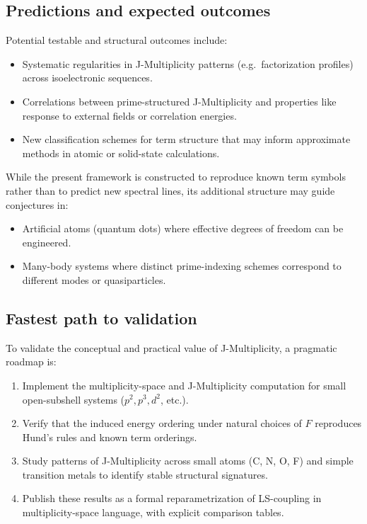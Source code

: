 \documentclass[11pt]{article}
\begin{document}
\subsection{Predictions and expected outcomes}

Potential testable and structural outcomes include:
\begin{itemize}
  \item Systematic regularities in J-Multiplicity patterns (e.g.\ factorization profiles) across isoelectronic sequences.
  \item Correlations between prime-structured J-Multiplicity and properties like response to external fields or correlation energies.
  \item New classification schemes for term structure that may inform approximate methods in atomic or solid-state calculations.
\end{itemize}

While the present framework is constructed to reproduce known term symbols rather than to predict new spectral lines, its additional structure may guide conjectures in:
\begin{itemize}
  \item Artificial atoms (quantum dots) where effective degrees of freedom can be engineered.
  \item Many-body systems where distinct prime-indexing schemes correspond to different modes or quasiparticles.
\end{itemize}

\subsection{Fastest path to validation}

To validate the conceptual and practical value of J-Multiplicity, a pragmatic roadmap is:
\begin{enumerate}
  \item Implement the multiplicity-space and J-Multiplicity computation for small open-subshell systems (\(p^2, p^3, d^2\), etc.).
  \item Verify that the induced energy ordering under natural choices of \(F\) reproduces Hund's rules and known term orderings.
  \item Study patterns of J-Multiplicity across small atoms (C, N, O, F) and simple transition metals to identify stable structural signatures.
  \item Publish these results as a formal reparametrization of LS-coupling in multiplicity-space language, with explicit comparison tables.
\end{enumerate}
\end{document}
